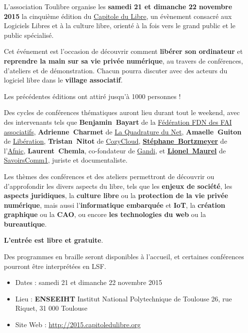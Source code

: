 
\Separateur

\par{\fontsize{12pt}{18pt}\selectfont
  L'association Toulibre organise les \textbf{samedi 21 et dimanche 22 novembre 2015} la cinquième
  édition du \href{http://capitoledulibre.org}{Capitole du Libre},
  un évènement consacré aux Logiciels Libres et à la culture libre,
  orienté à la fois vers le grand public et le public spécialisé.
}

\Separateur

Cet événement est l'occasion de découvrir comment \textbf{libérer son ordinateur}
et \textbf{reprendre la main sur sa vie privée numérique},
au travers de conférences, d'ateliers et de démonstration.
Chacun pourra discuter avec des acteurs du logiciel libre dans le \textbf{village associatif}.

Les précédentes éditions ont attiré jusqu'à 1000 personnes !

\Separateur

Des cycles de conférences thématiques auront lieu durant tout le weekend,
avec des intervenants tels que \textbf{\mbox{Benjamin Bayart}} de la \href{http://ffdn.org/}{Fédération FDN des FAI associatifs},
\textbf{\mbox{Adrienne Charmet}} de \href{http://laquadrature.net/}{La Quadrature du Net},
\textbf{\mbox{Amaelle Guiton}} de \href{http://www.liberation.fr/auteur/15260-amaelle-guiton}{Libération},
\textbf{\mbox{Tristan Nitot}} de \href{https://cozy.io/fr/}{CozyCloud},
\textbf{\href{http://www.bortzmeyer.org/}{\mbox{Stéphane Bortzmeyer}}} de l'\href{}{Afnic},
\textbf{\mbox{Laurent Chemla}}, co-fondateur de \href{http://gandi.net/}{Gandi},
et \textbf{\href{http://scinfolex.com/}{\mbox{Lionel Maurel}}} de \href{http://savoirscom1.info/}{SavoirsComm1}, juriste et documentaliste.

\Separateur

Les thèmes des conférences et des ateliers permettront de découvrir ou d'approfondir
les divers aspects du libre, tels que les \textbf{enjeux de société}, les \textbf{aspects juridiques},
la \textbf{culture libre} ou la \textbf{protection de la vie privée numérique},
mais aussi l'\textbf{informatique embarquée} et \textbf{IoT}, la \textbf{création graphique} ou la \textbf{CAO},
ou encore \textbf{les technologies du web} ou la \textbf{bureautique}.

\Separateur

\textbf{L'entrée est libre et gratuite}.

\Separateur

Des programmes en braille seront disponibles à l'accueil, et certaines conférences pourront être interprétées en LSF.

\begin{itemize}[label=$\bullet$]
\item Dates : samedi 21 et dimanche 22 novembre 2015
\item Lieu : \textbf{ENSEEIHT} Institut National Polytechnique de Toulouse
26, rue Riquet, 31 000 Toulouse
\item Site Web : \href{http://capitoledulibre.org}{http://2015.capitoledulibre.org}
\end{itemize}
